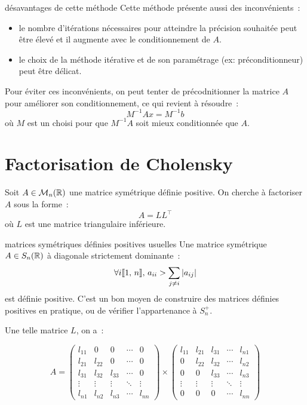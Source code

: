 \begin{remarque}{}{désavantages de cette méthode}
    Cette méthode présente aussi des inconvénients~:
    \begin{itemize}
        \item le nombre d'itérations nécessaires pour atteindre la précision souhaitée peut être élevé et il augmente avec le conditionnement de $A$.
        \item le choix de la méthode itérative et de son paramétrage (ex: préconditionneur) peut être délicat.
    \end{itemize}
    Pour éviter ces inconvénients, on peut tenter de précodnitionner la matrice $A$ pour améliorer son conditionnement, ce qui revient à résoudre~:
    $$M^{-1}Ax = M^{-1}b$$
    où $M$ est un  choisi pour que $M^{-1}A$ soit mieux conditionnée que $A$.
\end{remarque}

\section{Factorisation de Cholensky}

Soit $A \in \mathcal{M}_{n}(\mathbb{R})$ une matrice symétrique définie positive. On cherche à factoriser $A$ sous la forme~:
$$A = LL^\top$$
où $L$ est une matrice triangulaire inférieure.\\

\begin{remarque}{}{matrices symétriques définies positives usuelles}
    Une matrice symétrique $A \in S_n(\mathbb{R})$ à diagonale strictement dominante~:
    $$\forall i \llbracket 1 ,\, n \rrbracket,\, a_{ii} > \sum_{j \neq i} |a_{ij}|$$
    est définie positive. C'est un bon moyen de construire des matrices définies positives en pratique, ou de vérifier l'appartenance à $S_n^+$.
\end{remarque}

Une telle matrice $L$, on a~:

$$A = \begin{pmatrix}
    l_{11} & 0 & 0 & \cdots & 0\\
    l_{21} & l_{22} & 0 & \cdots & 0\\
    l_{31} & l_{32} & l_{33} & \cdots & 0\\
    \vdots & \vdots & \vdots & \ddots & \vdots\\
    l_{n1} & l_{n2} & l_{n3} & \cdots & l_{nn}
\end{pmatrix}\times \begin{pmatrix}
    l_{11} & l_{21} & l_{31} & \cdots & l_{n1}\\
    0 & l_{22} & l_{32} & \cdots & l_{n2}\\
    0 & 0 & l_{33} & \cdots & l_{n3}\\
    \vdots & \vdots & \vdots & \ddots & \vdots\\
    0 & 0 & 0 & \cdots & l_{nn}
\end{pmatrix}$$

